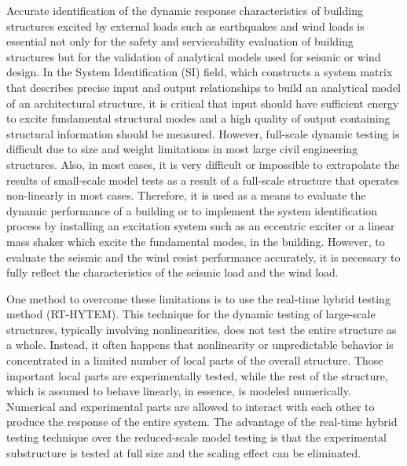 Accurate identification of the dynamic response characteristics of building structures excited by external loads such as earthquakes and wind loads is essential not only for the safety and serviceability evaluation of building structures but for the validation of analytical models used for seismic or wind design\citep{ljung1987system}. In the System Identification (SI) field, which constructs a system matrix that describes precise input and output relationships to build an analytical model of an architectural structure, it is critical that input should have sufficient energy to excite fundamental structural modes and a high quality of output containing structural information should be measured\citep{alvin1994second,madenci1994free}. However, full-scale dynamic testing is difficult due to size and weight limitations in most large civil engineering structures. Also, in most cases, it is very difficult or impossible to extrapolate the results of small-scale model tests as a result of a full-scale structure that operates non-linearly in most cases. Therefore, it is used as a means to evaluate the dynamic performance of a building or to implement the system identification process by installing an excitation system such as an eccentric exciter or a linear mass shaker which excite the fundamental modes, in the building. However, to evaluate the seismic and the wind resist performance accurately, it is necessary to fully reflect the characteristics of the seismic load and the wind load.

One method to overcome these limitations is to use the real-time hybrid testing method (RT-HYTEM). This technique for the dynamic testing of large-scale structures, typically involving nonlinearities, does not test the entire structure as a whole. Instead, it often happens that nonlinearity or unpredictable behavior is concentrated in a limited number of local parts of the overall structure. Those important local parts are experimentally tested, while the rest of the structure, which is assumed to behave linearly, in essence, is modeled numerically. Numerical and experimental parts are allowed to interact with each other to produce the response of the entire system. The advantage of the real-time hybrid testing technique over the reduced-scale model testing is that the experimental substructure is tested at full size and the scaling effect can be eliminated. 

